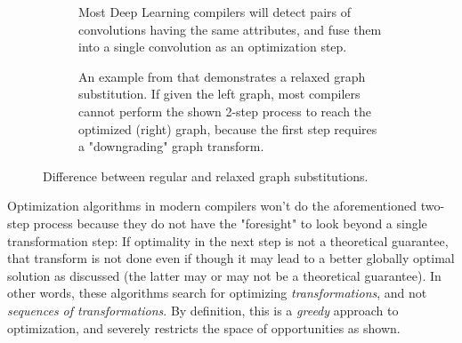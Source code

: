 \documentclass[12pt,a4paper,twoside,openright,bibliography=totocnumbered]{report}
\begin{document}
\begin{figure}[ht!]
	\begin{subfigure}{\textwidth}
        \centering
        \caption{Most Deep Learning compilers will detect pairs of convolutions having the same attributes, and fuse them into a single convolution as an optimization step.}
        \label{resnet_a}
    \end{subfigure}
    \begin{subfigure}{\textwidth}
        \centering
        \caption{An example from \cite{jia2019} that demonstrates a relaxed graph substitution. If given the left graph, most compilers cannot perform the shown 2-step process to reach the optimized (right) graph, because the first step requires a "downgrading" graph transform.}
        \label{resnet_b}
    \end{subfigure}
    \caption{Difference between regular and relaxed graph substitutions.}
	\label{resnet}
\end{figure}

Optimization algorithms in modern compilers won't do the aforementioned two-step process because they do not have the "foresight" to look beyond a single transformation step: If optimality in the next step is not a theoretical guarantee, that transform is not done even if though it may lead to a better globally optimal solution as discussed (the latter may or may not be a theoretical guarantee). In other words, these algorithms search for optimizing \textit{transformations}, and not \textit{sequences of transformations}. By definition, this is a \textit{greedy} approach to optimization, and severely restricts the space of opportunities as shown. 
\end{document}
